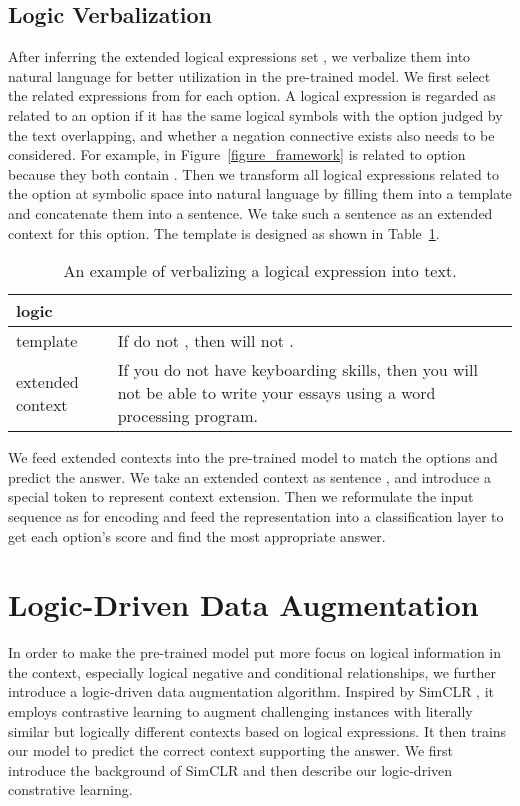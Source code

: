 \documentclass[11pt,a4paper]{article}
\begin{document}
\subsection{Logic Verbalization}
\label{sec:translation_step}
After inferring the extended logical expressions set , we verbalize them into natural language for better utilization in the pre-trained model.
We first select the related expressions from  for each option. A logical expression is regarded as related to an option if it has the same logical symbols with the option judged by the text overlapping, and whether a negation connective exists also needs to be considered. 
For example,  in Figure~\ref{figure_framework} is related to option  because they both contain . Then we transform all logical expressions related to the option at symbolic space into natural language by filling them into a template and concatenate them into a sentence. We take such a sentence as an extended context for this option. The template is designed as shown in Table~\ref{table_template}.
\begin{table}[ht]
\begin{center}
\begin{tabular}{|p{1.3cm}|p{5.5cm}|}
\hline
logic &  \\
\hline
template & If do not , then will not . \\
\hline
extended context & If you do not have keyboarding skills, then you will not be able to write your essays using a word processing program.\\
\hline
\end{tabular}
\end{center}
\caption{\label{table_template} An example of verbalizing a logical expression into text.}
\end{table}

We feed extended contexts into the pre-trained model to match the options and predict the answer. 
We take an extended context as sentence , and introduce a special token  to represent context extension. Then we reformulate the input sequence as
 for encoding and feed the  representation into a classification layer to get each option's score and find the most appropriate answer.  


\section{Logic-Driven Data Augmentation}
In order to make the pre-trained model put more focus on logical information in the context, especially logical negative and conditional relationships, we further introduce a logic-driven data augmentation algorithm. Inspired by SimCLR \cite{chen2020simple}, it employs contrastive learning to augment challenging instances with literally similar but logically different contexts based on logical expressions. It then trains our model to predict the correct context supporting the answer.
We first introduce the background of SimCLR and then describe our logic-driven constrative learning. 
\end{document}
